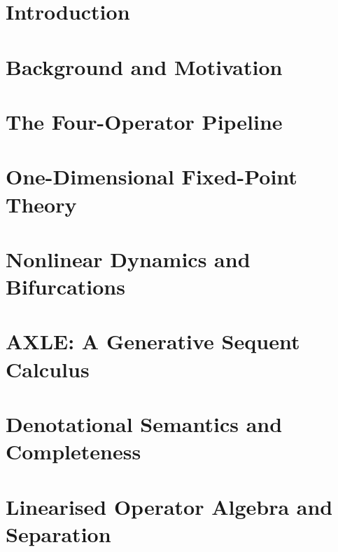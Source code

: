 \documentclass[12pt, oneside]{book}
\theoremstyle{plain}
\theoremstyle{definition}
\theoremstyle{remark}
\begin{document}
\tableofcontents

\section{Introduction}

\section{Background and Motivation}

\section{The Four-Operator Pipeline}

\section{One-Dimensional Fixed-Point Theory}

\section{Nonlinear Dynamics and Bifurcations}

\section{AXLE: A Generative Sequent Calculus}

\section{Denotational Semantics and Completeness}

\section{Linearised Operator Algebra and Separation}
\label{sec:linear-separation}

\end{document}
